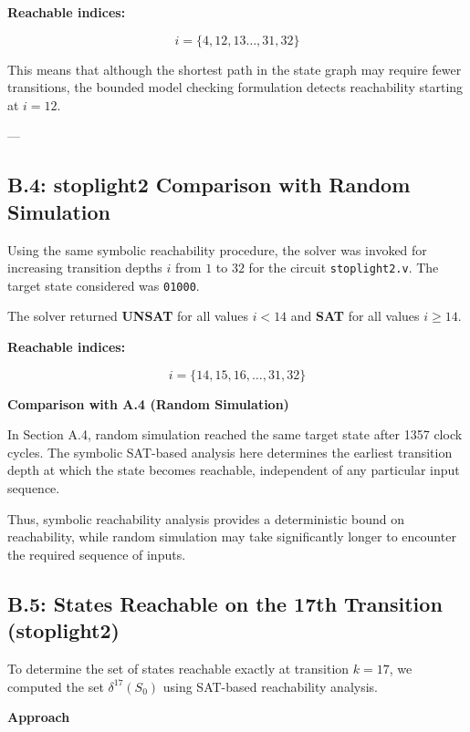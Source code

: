 \documentclass[10pt]{article}
\begin{document}
\textbf{Reachable indices:}

\[
i = \{4, 12, 13 \dots, 31, 32\}
\]

This means that although the shortest path in the state graph may require fewer transitions, the bounded model checking formulation detects reachability starting at $i=12$.

---

\subsection*{B.4: stoplight2 Comparison with Random Simulation}

Using the same symbolic reachability procedure, the solver was invoked for increasing transition depths $i$ from $1$ to $32$ for the circuit \texttt{stoplight2.v}. The target state considered was \texttt{01000}.

The solver returned \textbf{UNSAT} for all values $i < 14$ and \textbf{SAT} for all values $i \geq 14$.

\textbf{Reachable indices:}

\[
i = \{14, 15, 16, \dots, 31, 32\}
\]

\textbf{Comparison with A.4 (Random Simulation)}

In Section A.4, random simulation reached the same target state after 1357 clock cycles. The symbolic SAT-based analysis here determines the earliest transition depth at which the state becomes reachable, independent of any particular input sequence.

Thus, symbolic reachability analysis provides a deterministic bound on reachability, while random simulation may take significantly longer to encounter the required sequence of inputs.


\subsection*{B.5: States Reachable on the 17th Transition (stoplight2)}

To determine the set of states reachable exactly at transition $k=17$, we computed the set $\delta^{17}(S_0)$ using SAT-based reachability analysis.

\textbf{Approach}
\end{document}
